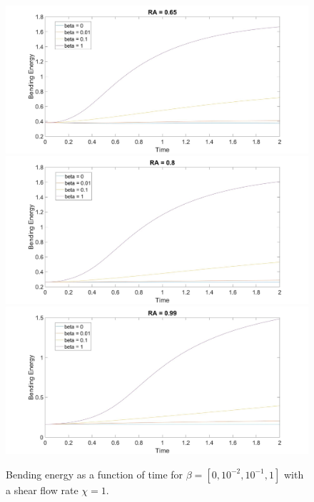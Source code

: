 \documentclass[aps,prl,showpacs]{revtex4}
\begin{document}
 \begin{figure}
 	\centering
 	\includegraphics[width=.9\textwidth]{figures/BE7.jpg}
 	\includegraphics[width=.9\textwidth]{figures/BE8.jpg}
 	\includegraphics[width=.9\textwidth]{figures/BE9.jpg}
 	\caption{Bending energy as a function of time for $\beta = [0, 10^{-2},10^{-1}, 1]$ with a shear flow rate $\chi = 1$.}
 \end{figure}
 
\end{document}
